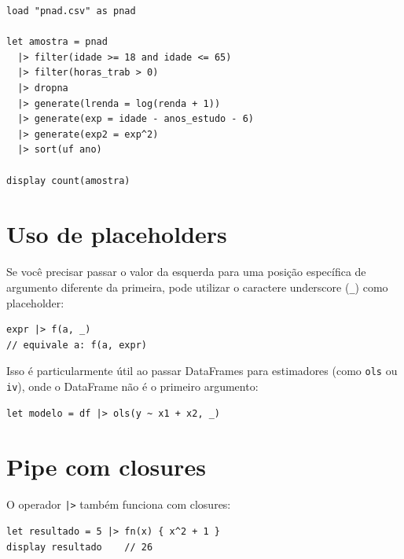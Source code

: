 \begin{lstlisting}[caption={Pipeline completo de preparação}]
load "pnad.csv" as pnad

let amostra = pnad
  |> filter(idade >= 18 and idade <= 65)
  |> filter(horas_trab > 0)
  |> dropna
  |> generate(lrenda = log(renda + 1))
  |> generate(exp = idade - anos_estudo - 6)
  |> generate(exp2 = exp^2)
  |> sort(uf ano)

display count(amostra)
\end{lstlisting}

\section{Uso de placeholders}

Se você precisar passar o valor da esquerda para uma posição específica de argumento diferente da primeira, pode utilizar o caractere underscore (\lstinline{_}) como placeholder:

\begin{lstlisting}
expr |> f(a, _)
// equivale a: f(a, expr)
\end{lstlisting}

Isso é particularmente útil ao passar DataFrames para estimadores (como \lstinline{ols} ou \lstinline{iv}), onde o DataFrame não é o primeiro argumento:

\begin{lstlisting}
let modelo = df |> ols(y ~ x1 + x2, _)
\end{lstlisting}

\section{Pipe com closures}

O operador \lstinline{|>} também funciona com closures:

\begin{lstlisting}
let resultado = 5 |> fn(x) { x^2 + 1 }
display resultado    // 26
\end{lstlisting}
